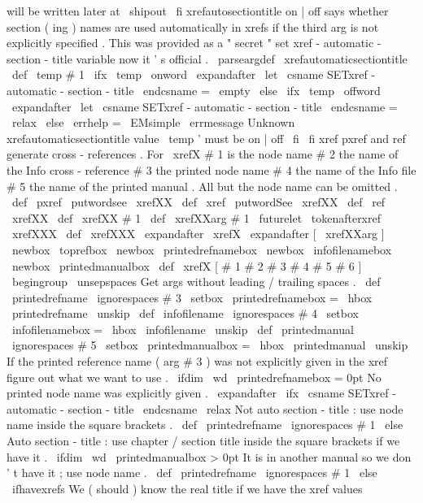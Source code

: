 {{{{{{{}
%
will
be
written
later
at
\
shipout
}
%
\
fi
}
%
xrefautosectiontitle
on
|
off
says
whether
section
(
ing
)
names
are
used
%
automatically
in
xrefs
if
the
third
arg
is
not
explicitly
specified
.
%
This
was
provided
as
a
"
secret
"
set
xref
-
automatic
-
section
-
title
%
variable
now
it
'
s
official
.
%
\
parseargdef
\
xrefautomaticsectiontitle
{
%
\
def
\
temp
{
#
1
}
%
\
ifx
\
temp
\
onword
\
expandafter
\
let
\
csname
SETxref
-
automatic
-
section
-
title
\
endcsname
=
\
empty
\
else
\
ifx
\
temp
\
offword
\
expandafter
\
let
\
csname
SETxref
-
automatic
-
section
-
title
\
endcsname
=
\
relax
\
else
\
errhelp
=
\
EMsimple
\
errmessage
{
Unknown
xrefautomaticsectiontitle
value
\
temp
'
must
be
on
|
off
}
%
\
fi
\
fi
}
%
%
xref
pxref
and
ref
generate
cross
-
references
.
For
\
xrefX
#
1
is
%
the
node
name
#
2
the
name
of
the
Info
cross
-
reference
#
3
the
printed
%
node
name
#
4
the
name
of
the
Info
file
#
5
the
name
of
the
printed
%
manual
.
All
but
the
node
name
can
be
omitted
.
%
\
def
\
pxref
{
\
putwordsee
{
}
\
xrefXX
}
\
def
\
xref
{
\
putwordSee
{
}
\
xrefXX
}
\
def
\
ref
{
\
xrefXX
}
\
def
\
xrefXX
#
1
{
\
def
\
xrefXXarg
{
#
1
}
\
futurelet
\
tokenafterxref
\
xrefXXX
}
\
def
\
xrefXXX
{
\
expandafter
\
xrefX
\
expandafter
[
\
xrefXXarg
]
}
%
\
newbox
\
toprefbox
\
newbox
\
printedrefnamebox
\
newbox
\
infofilenamebox
\
newbox
\
printedmanualbox
%
\
def
\
xrefX
[
#
1
#
2
#
3
#
4
#
5
#
6
]
{
\
begingroup
\
unsepspaces
%
%
Get
args
without
leading
/
trailing
spaces
.
\
def
\
printedrefname
{
\
ignorespaces
#
3
}
%
\
setbox
\
printedrefnamebox
=
\
hbox
{
\
printedrefname
\
unskip
}
%
%
\
def
\
infofilename
{
\
ignorespaces
#
4
}
%
\
setbox
\
infofilenamebox
=
\
hbox
{
\
infofilename
\
unskip
}
%
%
\
def
\
printedmanual
{
\
ignorespaces
#
5
}
%
\
setbox
\
printedmanualbox
=
\
hbox
{
\
printedmanual
\
unskip
}
%
%
%
If
the
printed
reference
name
(
arg
#
3
)
was
not
explicitly
given
in
%
the
xref
figure
out
what
we
want
to
use
.
\
ifdim
\
wd
\
printedrefnamebox
=
0pt
%
No
printed
node
name
was
explicitly
given
.
\
expandafter
\
ifx
\
csname
SETxref
-
automatic
-
section
-
title
\
endcsname
\
relax
%
Not
auto
section
-
title
:
use
node
name
inside
the
square
brackets
.
\
def
\
printedrefname
{
\
ignorespaces
#
1
}
%
\
else
%
Auto
section
-
title
:
use
chapter
/
section
title
inside
%
the
square
brackets
if
we
have
it
.
\
ifdim
\
wd
\
printedmanualbox
>
0pt
%
It
is
in
another
manual
so
we
don
'
t
have
it
;
use
node
name
.
\
def
\
printedrefname
{
\
ignorespaces
#
1
}
%
\
else
\
ifhavexrefs
%
We
(
should
)
know
the
real
title
if
we
have
the
xref
values
}}}}}
